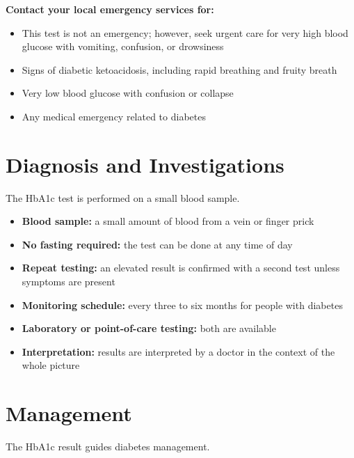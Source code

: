\textbf{Contact your local emergency services for:}
\begin{itemize}
    \item This test is not an emergency; however, seek urgent care for very high blood glucose with vomiting, confusion, or drowsiness
    \item Signs of diabetic ketoacidosis, including rapid breathing and fruity breath
    \item Very low blood glucose with confusion or collapse
    \item Any medical emergency related to diabetes
\end{itemize}

\section*{Diagnosis and Investigations}
The HbA1c test is performed on a small blood sample.

\begin{itemize}
    \item \textbf{Blood sample:} a small amount of blood from a vein or finger prick
    \item \textbf{No fasting required:} the test can be done at any time of day
    \item \textbf{Repeat testing:} an elevated result is confirmed with a second test unless symptoms are present
    \item \textbf{Monitoring schedule:} every three to six months for people with diabetes
    \item \textbf{Laboratory or point-of-care testing:} both are available
    \item \textbf{Interpretation:} results are interpreted by a doctor in the context of the whole picture
\end{itemize}

\section*{Management}
The HbA1c result guides diabetes management.

